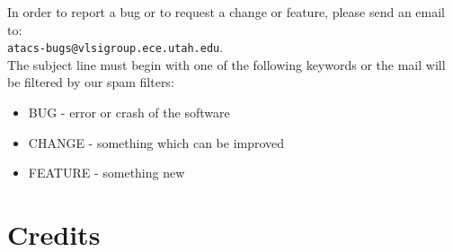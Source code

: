\documentclass[titlepage,11pt]{article}
\begin{document}
\noindent
In order to report a bug or to request a change or feature, please
send an email to:\\ 
{\tt atacs-bugs@vlsigroup.ece.utah.edu}.\\
The subject line must begin with one of the following keywords or the
mail will be filtered by our spam filters:
\begin{itemize}
\item BUG - error or crash of the software
\item CHANGE - something which can be improved
\item FEATURE - something new
\end{itemize}

\section{Credits}
\end{document}

